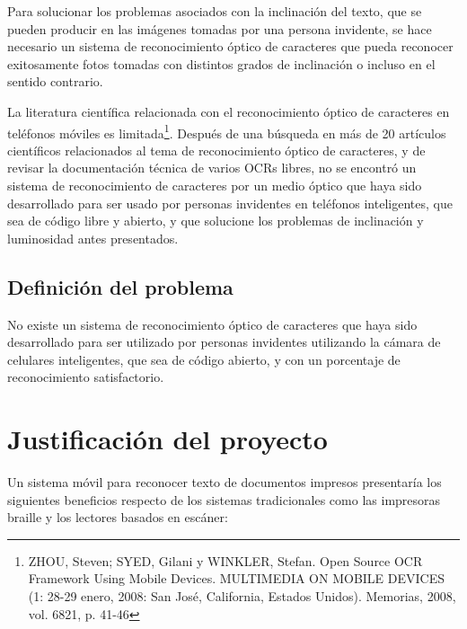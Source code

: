\documentclass[a4paper, 11pt, oneside]{report}
\begin{document}
Para solucionar los problemas asociados con la inclinación del texto, que se pueden producir en las imágenes tomadas por una persona invidente, se hace necesario un sistema de reconocimiento óptico de caracteres que pueda reconocer exitosamente fotos tomadas con distintos grados de inclinación o incluso en el sentido contrario.

La literatura científica relacionada con el reconocimiento óptico de caracteres en teléfonos móviles es limitada\footnote{ZHOU, Steven; SYED, Gilani y WINKLER, Stefan. Open Source OCR Framework Using Mobile Devices. MULTIMEDIA ON MOBILE DEVICES (1: 28-29 enero, 2008: San José, California, Estados Unidos). Memorias, 2008, vol. 6821, p. 41-46}. Después de una búsqueda en más de 20 artículos científicos relacionados al tema de reconocimiento óptico de caracteres, y de revisar la documentación técnica de varios OCRs libres, no se encontró un sistema de reconocimiento de caracteres por un medio óptico que haya sido desarrollado para ser usado por personas invidentes en teléfonos inteligentes, que sea de código libre y abierto, y que solucione los problemas de inclinación y luminosidad antes presentados.

\subsection{Definición del problema}

No existe un sistema de reconocimiento óptico de caracteres que haya sido desarrollado para ser utilizado por personas invidentes utilizando la cámara de celulares inteligentes, que sea de código abierto, y con un porcentaje de reconocimiento satisfactorio.

\section{Justificación del proyecto}

Un sistema móvil para reconocer texto de documentos impresos presentaría los siguientes beneficios respecto de los sistemas tradicionales como las impresoras braille y los lectores basados en escáner:
\end{document}
